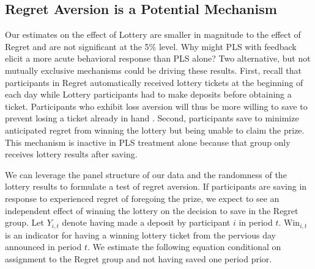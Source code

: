 \documentclass[11pt]{article}
\begin{document}




	\subsection{Regret Aversion is a Potential Mechanism}

		Our estimates on the effect of Lottery are smaller in magnitude to the effect of Regret and are not significant at the 5\% level. Why might PLS with feedback elicit a more acute behavioral response than PLS alone? Two alternative, but not mutually exclusive mechanisms could be driving these results. First, recall that participants in Regret automatically received lottery tickets at the beginning of each day while Lottery participants had to make deposits before obtaining a ticket. Participants who exhibit loss aversion will thus be more willing to save to prevent losing a ticket already in hand \parencite{kahneman_advances_1992}. Second, participants save to minimize anticipated regret from winning the lottery but being unable to claim the prize. This mechanism is inactive in PLS treatment alone because that group only receives lottery results after saving.


		We can leverage the panel structure of our data and the randomness of the lottery results to formulate a test of regret aversion. If participants are saving in response to experienced regret of foregoing the prize, we expect to see an independent effect of winning the lottery on the decision to save in the Regret group. Let $Y_{i,t}$ denote having made a deposit by participant $i$ in period $t$. $\text{Win}_{i,t}$ is an indicator for having a winning lottery ticket from the pervious day announced in period $t$. We estimate the following equation conditional on assignment to the Regret group and not having saved one period prior.
\end{document}
